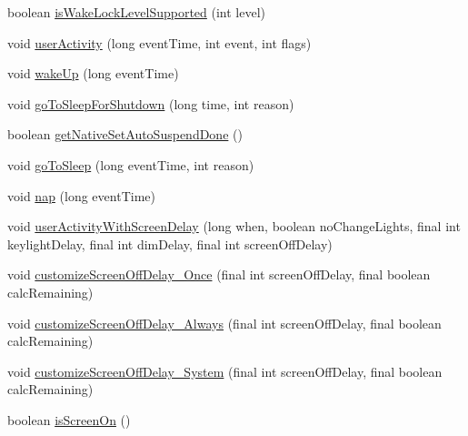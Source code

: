\begin{DoxyCompactItemize}
boolean \hyperlink{classcom_1_1android_1_1server_1_1power_1_1PowerManagerService_ad611e00d7d64d1d0f87ae76be7446b73}{is\-Wake\-Lock\-Level\-Supported} (int level)
\item 
void \hyperlink{classcom_1_1android_1_1server_1_1power_1_1PowerManagerService_a7b38d6b64ca48c42701d423494675c64}{user\-Activity} (long event\-Time, int event, int flags)
\item 
void \hyperlink{classcom_1_1android_1_1server_1_1power_1_1PowerManagerService_ab4216ff9e76a76254a64f4097becdf32}{wake\-Up} (long event\-Time)
\item 
void \hyperlink{classcom_1_1android_1_1server_1_1power_1_1PowerManagerService_acbf0e30e8cf85ab34974082d98321858}{go\-To\-Sleep\-For\-Shutdown} (long time, int reason)
\item 
boolean \hyperlink{classcom_1_1android_1_1server_1_1power_1_1PowerManagerService_a9a132717d1b3e6ab90aa5383229db1bf}{get\-Native\-Set\-Auto\-Suspend\-Done} ()
\item 
void \hyperlink{classcom_1_1android_1_1server_1_1power_1_1PowerManagerService_a988e232d9be4d9b76c69a386a9b2bddd}{go\-To\-Sleep} (long event\-Time, int reason)
\item 
void \hyperlink{classcom_1_1android_1_1server_1_1power_1_1PowerManagerService_a3838189fff42aad9929fd3b0493264cf}{nap} (long event\-Time)
\item 
void \hyperlink{classcom_1_1android_1_1server_1_1power_1_1PowerManagerService_ac3f7d0be2dfe51cbc4f4adfd11a8c58a}{user\-Activity\-With\-Screen\-Delay} (long when, boolean no\-Change\-Lights, final int keylight\-Delay, final int dim\-Delay, final int screen\-Off\-Delay)
\item 
void \hyperlink{classcom_1_1android_1_1server_1_1power_1_1PowerManagerService_a2c7c87f894a98724d0f917e49aab0638}{customize\-Screen\-Off\-Delay\-\_\-\-Once} (final int screen\-Off\-Delay, final boolean calc\-Remaining)
\item 
void \hyperlink{classcom_1_1android_1_1server_1_1power_1_1PowerManagerService_aaee5f3f019a74b2bf1099b85a61758a8}{customize\-Screen\-Off\-Delay\-\_\-\-Always} (final int screen\-Off\-Delay, final boolean calc\-Remaining)
\item 
void \hyperlink{classcom_1_1android_1_1server_1_1power_1_1PowerManagerService_a2f0c0d1672e980162d6e58e129934ae5}{customize\-Screen\-Off\-Delay\-\_\-\-System} (final int screen\-Off\-Delay, final boolean calc\-Remaining)
\item 
boolean \hyperlink{classcom_1_1android_1_1server_1_1power_1_1PowerManagerService_a7d58ccc5c065d016a6574f5ccb0485e3}{is\-Screen\-On} ()

\end{DoxyCompactItemize}
